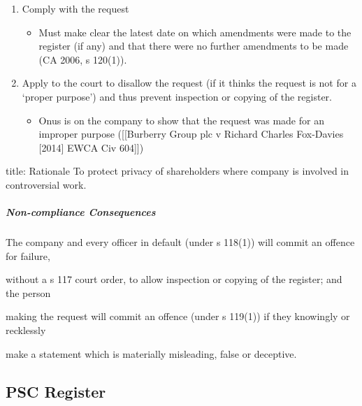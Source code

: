 \documentclass[
]{article}
\newenvironment{Shaded}{}{}
\newcommand{\NormalTok}[1]{#1}
\providecommand{\tightlist}{%
  \setlength{\itemsep}{0pt}\setlength{\parskip}{0pt}}
\begin{document}
\begin{enumerate}
\def\labelenumi{\arabic{enumi}.}
\tightlist
\item
  Comply with the request

  \begin{itemize}
  \tightlist
  \item
    Must make clear the latest date on which amendments were made to the
    register (if any) and that there were no further amendments to be
    made (CA 2006, s 120(1)).
  \end{itemize}
\item
  Apply to the court to disallow the request (if it thinks the request
  is not for a `proper purpose') and thus prevent inspection or copying
  of the register.

  \begin{itemize}
  \tightlist
  \item
    Onus is on the company to show that the request was made for an
    improper purpose ({[}{[}Burberry Group plc v Richard Charles
    Fox-Davies {[}2014{]} EWCA Civ 604{]}{]})
  \end{itemize}
\end{enumerate}

\begin{Shaded}
\begin{Highlighting}[]
\NormalTok{title: Rationale }
\NormalTok{To protect privacy of shareholders where company is involved in controversial work.}
\end{Highlighting}
\end{Shaded}

\hypertarget{non-compliance-consequences}{%
\subparagraph{Non-compliance
Consequences}\label{non-compliance-consequences}}

The company and every officer in default (under s 118(1)) will commit an
offence for failure,

without a s 117 court order, to allow inspection or copying of the
register; and the person

making the request will commit an offence (under s 119(1)) if they
knowingly or recklessly

make a statement which is materially misleading, false or deceptive.

\hypertarget{psc-register}{%
\subsection{PSC Register}\label{psc-register}}
\end{document}
